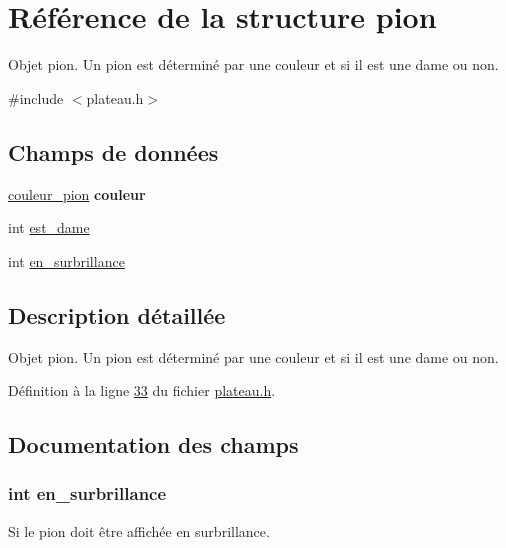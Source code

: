 \hypertarget{structpion}{
\section{Référence de la structure pion}
\label{structpion}
}


Objet pion. Un pion est déterminé par une couleur et si il est une dame ou non.  




{\ttfamily \#include $<$plateau.h$>$}

\subsection*{Champs de données}
\begin{DoxyCompactItemize}
\item 
\hypertarget{structpion_a057f95a41503a890f27c651969ffac8d}{
\hyperlink{plateau_8h_a8282be6127518547fa916dd6cfef17cb}{couleur\_\-pion} {\bfseries couleur}}
\label{structpion_a057f95a41503a890f27c651969ffac8d}

\item 
int \hyperlink{structpion_a13d497ed763d6eba18df86caf4c85861}{est\_\-dame}
\item 
int \hyperlink{structpion_ae49bb71ca6836b02fd9efa3c1fa64405}{en\_\-surbrillance}
\end{DoxyCompactItemize}


\subsection{Description détaillée}
Objet pion. Un pion est déterminé par une couleur et si il est une dame ou non. 

Définition à la ligne \hyperlink{plateau_8h_source_l00033}{33} du fichier \hyperlink{plateau_8h_source}{plateau.h}.



\subsection{Documentation des champs}
\hypertarget{structpion_ae49bb71ca6836b02fd9efa3c1fa64405}{
\subsubsection[{en\_\-surbrillance}]{\setlength{\rightskip}{0pt plus 5cm}int {\bf en\_\-surbrillance}}}
\label{structpion_ae49bb71ca6836b02fd9efa3c1fa64405}
Si le pion doit être affichée en surbrillance. 

